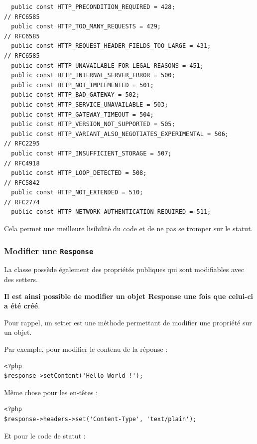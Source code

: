 \documentclass{article}
\begin{document}
\begin{verbatim}
  public const HTTP_PRECONDITION_REQUIRED = 428;                                       // RFC6585
  public const HTTP_TOO_MANY_REQUESTS = 429;                                           // RFC6585
  public const HTTP_REQUEST_HEADER_FIELDS_TOO_LARGE = 431;                             // RFC6585
  public const HTTP_UNAVAILABLE_FOR_LEGAL_REASONS = 451;
  public const HTTP_INTERNAL_SERVER_ERROR = 500;
  public const HTTP_NOT_IMPLEMENTED = 501;
  public const HTTP_BAD_GATEWAY = 502;
  public const HTTP_SERVICE_UNAVAILABLE = 503;
  public const HTTP_GATEWAY_TIMEOUT = 504;
  public const HTTP_VERSION_NOT_SUPPORTED = 505;
  public const HTTP_VARIANT_ALSO_NEGOTIATES_EXPERIMENTAL = 506;                        // RFC2295
  public const HTTP_INSUFFICIENT_STORAGE = 507;                                        // RFC4918
  public const HTTP_LOOP_DETECTED = 508;                                               // RFC5842
  public const HTTP_NOT_EXTENDED = 510;                                                // RFC2774
  public const HTTP_NETWORK_AUTHENTICATION_REQUIRED = 511;
\end{verbatim}

Cela permet une meilleure lisibilité du code et de ne pas se tromper sur le statut.

\subsubsection{Modifier une {\tt Response}}
La classe possède également des propriétés publiques qui sont modifiables avec des setters.

{\bf Il est ainsi possible de modifier un objet Response une fois que celui-ci a été créé}.

Pour rappel, un setter est une méthode permettant de modifier une propriété sur un objet.

Par exemple, pour modifier le contenu de la réponse :

\begin{verbatim}
<?php
$response->setContent('Hello World !');
\end{verbatim}

Même chose pour les en-têtes :

\begin{verbatim}
<?php
$response->headers->set('Content-Type', 'text/plain');
\end{verbatim}
Et pour le code de statut :
\end{document}
